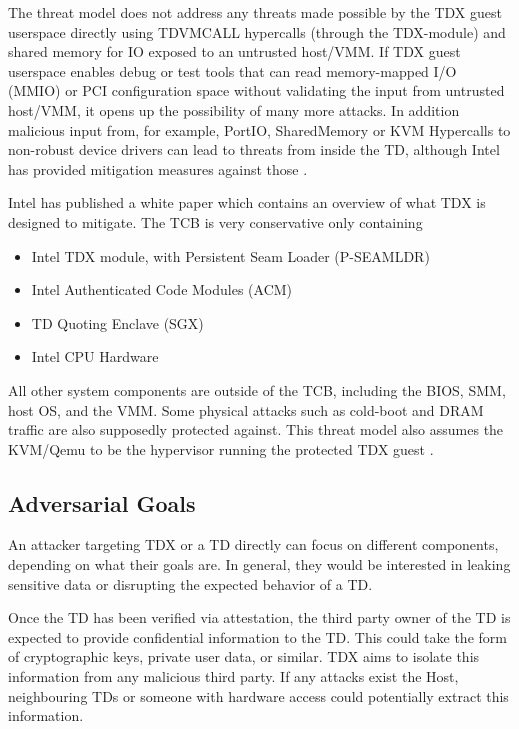 The threat model does not address any threats made possible by the TDX guest userspace directly using TDVMCALL hypercalls (through the TDX-module) and shared memory for IO exposed to an untrusted host/VMM. If TDX guest userspace enables debug or test tools that can read memory-mapped I/O (MMIO) or PCI configuration space without validating the input from untrusted host/VMM, it opens up the possibility of many more attacks. In addition malicious input from, for example,  PortIO, SharedMemory or KVM Hypercalls to non-robust device drivers can lead to threats from inside the TD, although Intel has provided mitigation measures against those \cite{linux-guest-hardening}.


Intel has published a white paper \cite{noauthor_tdx-whitepaper-february2022pdf_nodate} which contains an overview of what TDX is designed to mitigate. The TCB is very conservative only containing 
\begin{itemize}
    \item Intel TDX module, with Persistent Seam Loader (P-SEAMLDR)
    \item Intel Authenticated Code Modules (ACM)
    \item TD Quoting Enclave (SGX)
    \item Intel CPU Hardware
\end{itemize}
All other system components are outside of the TCB, including the BIOS, SMM, host OS, and the VMM. Some physical attacks such as cold-boot and DRAM traffic are also supposedly protected against. This threat model also assumes the KVM/Qemu to be the hypervisor running the protected TDX guest \cite{aktas_intel_nodate}.

\subsection{Adversarial Goals}
An attacker targeting TDX or a TD directly can focus on different components, depending on what their goals are. In general, they would be interested in leaking sensitive data or disrupting the expected behavior of a TD.


Once the TD has been verified via attestation, the third party owner of the TD is expected to provide confidential information to the TD. This could take the form of cryptographic keys, private user data, or similar. TDX aims to isolate this information from any malicious third party. If any attacks exist the Host, neighbouring TDs or someone with hardware access could potentially extract this information.

